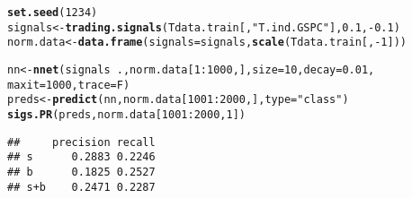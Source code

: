 \documentclass{article}\usepackage[]{graphicx}\usepackage[]{color}
\makeatletter
\newcommand{\hlnum}[1]{\textcolor[rgb]{0.686,0.059,0.569}{#1}}%
\newcommand{\hlstr}[1]{\textcolor[rgb]{0.192,0.494,0.8}{#1}}%
\newcommand{\hlopt}[1]{\textcolor[rgb]{0,0,0}{#1}}%
\newcommand{\hlstd}[1]{\textcolor[rgb]{0.345,0.345,0.345}{#1}}%
\newcommand{\hlkwb}[1]{\textcolor[rgb]{0.69,0.353,0.396}{#1}}%
\newcommand{\hlkwc}[1]{\textcolor[rgb]{0.333,0.667,0.333}{#1}}%
\newcommand{\hlkwd}[1]{\textcolor[rgb]{0.737,0.353,0.396}{\textbf{#1}}}%
\newenvironment{kframe}{%
 \def\at@end@of@kframe{}%
 \ifinner\ifhmode%
  \def\at@end@of@kframe{\end{minipage}}%
  \begin{minipage}{\columnwidth}%
 \fi\fi%
 \def\FrameCommand##1{\hskip\@totalleftmargin \hskip-\fboxsep
 \colorbox{shadecolor}{##1}\hskip-\fboxsep
     \hskip-\linewidth \hskip-\@totalleftmargin \hskip\columnwidth}%
 \MakeFramed {\advance\hsize-\width
   \@totalleftmargin\z@ \linewidth\hsize
   \@setminipage}}%
 {\par\unskip\endMakeFramed%
 \at@end@of@kframe}
\newenvironment{knitrout}{}{} %
\makeatother
\begin{document}
\begin{knitrout}
\color{fgcolor}\begin{kframe}
\begin{alltt}
\hlkwd{set.seed}\hlstd{(}\hlnum{1234}\hlstd{)}
\hlstd{signals}  \hlkwb{<-} \hlkwd{trading.signals}\hlstd{(Tdata.train[ ,} \hlstr{"T.ind.GSPC"}\hlstd{],} \hlnum{0.1}\hlstd{,} \hlopt{-}\hlnum{0.1}\hlstd{)}
\hlstd{norm.data} \hlkwb{<-} \hlkwd{data.frame}\hlstd{(}\hlkwc{signals} \hlstd{= signals,} \hlkwd{scale}\hlstd{(Tdata.train[ ,} \hlopt{-}\hlnum{1}\hlstd{]))}

\hlstd{nn} \hlkwb{<-} \hlkwd{nnet}\hlstd{(signals} \hlopt{~} \hlstd{., norm.data[}\hlnum{1}\hlopt{:}\hlnum{1000}\hlstd{, ],} \hlkwc{size} \hlstd{=} \hlnum{10}\hlstd{,} \hlkwc{decay} \hlstd{=} \hlnum{0.01}\hlstd{,}
           \hlkwc{maxit} \hlstd{=} \hlnum{1000}\hlstd{,} \hlkwc{trace} \hlstd{= F)}
\hlstd{preds} \hlkwb{<-} \hlkwd{predict}\hlstd{(nn, norm.data[}\hlnum{1001}\hlopt{:}\hlnum{2000}\hlstd{, ],} \hlkwc{type} \hlstd{=} \hlstr{"class"}\hlstd{)}
\hlkwd{sigs.PR}\hlstd{(preds, norm.data[}\hlnum{1001}\hlopt{:}\hlnum{2000}\hlstd{,} \hlnum{1}\hlstd{])}
\end{alltt}
\begin{verbatim}
##     precision recall
## s      0.2883 0.2246
## b      0.1825 0.2527
## s+b    0.2471 0.2287
\end{verbatim}
\end{kframe}
\end{knitrout}
\end{document}
